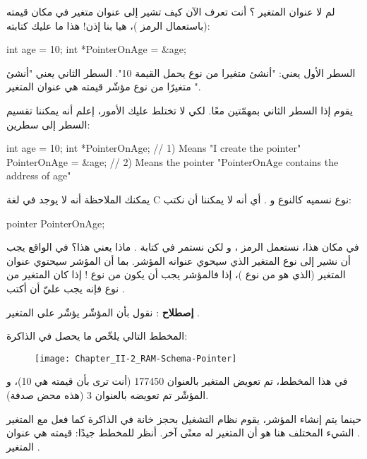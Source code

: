 لم لا عنوان المتغير
؟ أنت تعرف الآن كيف تشير إلى عنوان متغير في مكان قيمته (باستعمال الرمز
\InlineCode{\&})،
هيا بنا إذن! هذا ما عليك كتابته:

\begin{Csource}
int age = 10;
int *PointerOnAge = &age;
\end{Csource}

السطر الأول يعني: "أنشئ متغيرا من نوع
يحمل القيمة 10". السطر الثاني يعني "أنشئ متغيرًا من نوع مؤشّر قيمته هي عنوان المتغير
".

يقوم إذا السطر الثاني بمهمّتين معًا. لكي لا تختلط عليك الأمور، إعلم أنه يمكننا تقسيم السطر إلى سطرين:

\begin{Csource}
int age = 10;
int *PointerOnAge; // 1) Means "I create the pointer"
PointerOnAge = &age; // 2) Means the pointer "PointerOnAge contains the address of age"
\end{Csource}

يمكنك الملاحظة أنه لا يوجد في لغة \textenglish{C}
نوع نسميه
كالنوع
و
.
أي أنه لا يمكننا أن نكتب:

\begin{Csource}
pointer PointerOnAge;
\end{Csource}

في مكان هذا، نستعمل الرمز
\InlineCode{*}
، و لكن نستمر في كتابة
.
ماذا يعني هذا؟ في الواقع يجب أن نشير إلى نوع المتغير الذي سيحوي عنوانه المؤشر. بما أن المؤشر
سيحتوي عنوان المتغير
(الذي هو من نوع
)،
إذا فالمؤشر يجب أن يكون من نوع
! إذا كان المتغير من نوع
فإنه يجب عليّ أن أكتب
.

\textbf{إصطلاح}
: نقول بأن المؤشّر
يؤشّر على المتغير
.

المخطط التالي يلخّص ما يحصل في الذاكرة:

\begin{figure}[H]
	\centering
	\texttt{[image: Chapter\_II-2\_RAM-Schema-Pointer]}
\end{figure}

في هذا المخطط، تم تعويض المتغير
بالعنوان 177450 (أنت ترى بأن قيمته هي 10)، و المؤشّر
تم تعويضه بالعنوان 3 (هذه محض صدفة).

حينما يتم إنشاء المؤشر، يقوم نظام التشغيل بحجز خانة في الذاكرة كما فعل مع المتغير
.
الشيء المختلف هنا هو أن المتغير
له معنًى آخر. أنظر للمخطط جيدًا: قيمته هي عنوان المتغير
.

